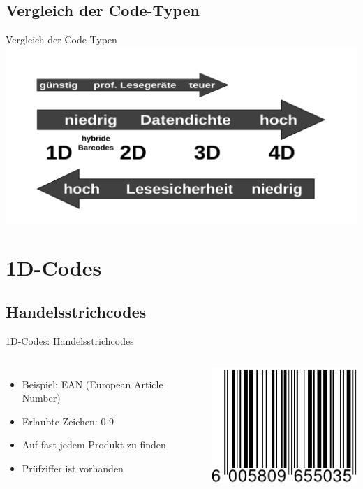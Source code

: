 \subsection{Vergleich der Code-Typen}
\begin{frame}{Vergleich der Code-Typen}
	\hfill\includegraphics[width=.95\textwidth]{muzy/vergleich.pdf}\hfill\hbox{}
\end{frame}

\section{1D-Codes}

\subsection{Handelsstrichcodes}

\begin{frame}[<+->]{1D-Codes: Handelsstrichcodes}
	\begin{columns}
		\begin{itemize}
		\item Beispiel: EAN (European Article Number)
		\item Erlaubte Zeichen: 0-9
		\item Auf fast jedem Produkt zu finden
		\item Prüfziffer ist vorhanden
		\end{itemize}
		\includegraphics[width=\textwidth]{muzy/1d-ean.pdf}
	\end{columns}
\end{frame}


